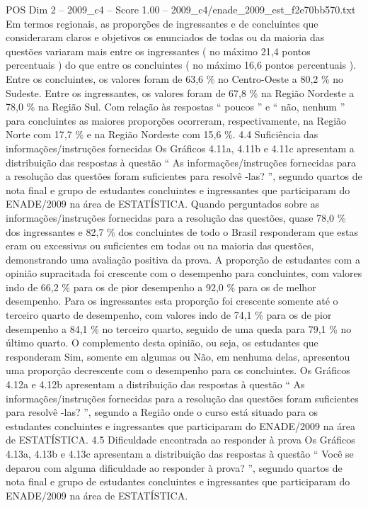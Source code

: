 \begin{textsample}{POS Dim 2 – 2009\_c4 – Score 1.00 – 2009\_c4/enade\_2009\_est\_f2e70bb570.txt}
Em termos regionais, as proporções de ingressantes e de concluintes que consideraram claros e objetivos os enunciados de todas ou da maioria das questões variaram mais entre os ingressantes ( no máximo 21,4 pontos percentuais ) do que entre os concluintes ( no máximo 16,6 pontos percentuais ).
Entre os concluintes, os valores foram de 63,6 \% no Centro-Oeste a 80,2 \% no Sudeste.
Entre os ingressantes, os valores foram de 67,8 \% na Região Nordeste a 78,0 \% na Região Sul.
Com relação às respostas “ poucos ” e “ não, nenhum ” para concluintes as maiores proporções ocorreram, respectivamente, na Região Norte com 17,7 \% e na Região Nordeste com 15,6 \%. 4.4 Suficiência das informações/instruções fornecidas Os Gráficos 4.11a, 4.11b e 4.11c apresentam a distribuição das respostas à questão “ As informações/instruções fornecidas para a resolução das questões foram suficientes para resolvê -las? ”, segundo quartos de nota final e grupo de estudantes concluintes e ingressantes que participaram do ENADE/2009 na área de ESTATÍSTICA.
Quando perguntados sobre as informações/instruções fornecidas para a resolução das questões, quase 78,0 \% dos ingressantes e 82,7 \% dos concluintes de todo o Brasil responderam que estas eram ou excessivas ou suficientes em todas ou na maioria das questões, demonstrando uma avaliação positiva da prova.
A proporção de estudantes com a opinião supracitada foi crescente com o desempenho para concluintes, com valores indo de 66,2 \% para os de pior desempenho a 92,0 \% para os de melhor desempenho.
Para os ingressantes esta proporção foi crescente somente até o terceiro quarto de desempenho, com valores indo de 74,1 \% para os de pior desempenho a 84,1 \% no terceiro quarto, seguido de uma queda para 79,1 \% no último quarto.
O complemento desta opinião, ou seja, os estudantes que responderam Sim, somente em algumas ou Não, em nenhuma delas, apresentou uma proporção decrescente com o desempenho para os concluintes.
Os Gráficos 4.12a e 4.12b apresentam a distribuição das respostas à questão “ As informações/instruções fornecidas para a resolução das questões foram suficientes para resolvê -las? ”, segundo a Região onde o curso está situado para os estudantes concluintes e ingressantes que participaram do ENADE/2009 na área de ESTATÍSTICA. 4.5 Dificuldade encontrada ao responder à prova Os Gráficos 4.13a, 4.13b e 4.13c apresentam a distribuição das respostas à questão “ Você se deparou com alguma dificuldade ao responder à prova? ”, segundo quartos de nota final e grupo de estudantes concluintes e ingressantes que participaram do ENADE/2009 na área de ESTATÍSTICA.

\end{textsample}
